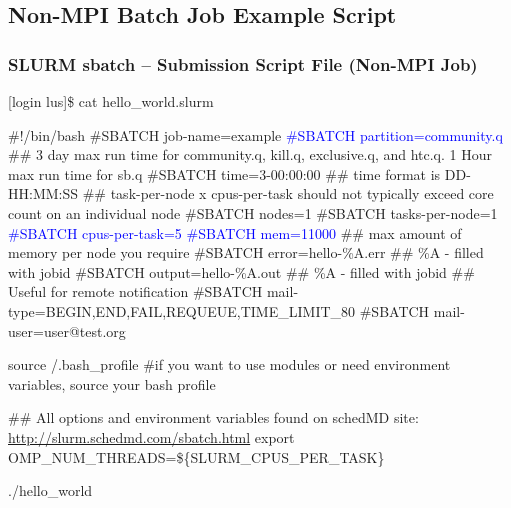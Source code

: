 \subsection{Non-MPI Batch Job Example Script}
\begin{frame}[fragile]
\frametitle{SLURM sbatch -- Submission Script File (Non-MPI Job)}
\begin{semiverbatim}\tiny
[login lus]\$ cat hello_world.slurm

\#!/bin/bash
\#SBATCH \ddash{}job-name=example
\textcolor{blue}{\#SBATCH \ddash{}partition=community.q}
\#\# 3 day max run time for community.q, kill.q, exclusive.q, and htc.q.  1 Hour max run time for sb.q
\#SBATCH \ddash{}time=3-00:00:00 ## time format is DD-HH:MM:SS
\#\# task-per-node x cpus-per-task should not typically exceed core count on an individual node 
\#SBATCH \ddash{}nodes=1
\#SBATCH \ddash{}tasks-per-node=1
\textcolor{blue}{\#SBATCH \ddash{}cpus-per-task=5}
\textcolor{blue}{\#SBATCH \ddash{}mem=11000} \#\# max amount of memory per node you require
\#SBATCH \ddash{}error=hello-\%A.err \#\# \%A - filled with jobid
\#SBATCH \ddash{}output=hello-\%A.out \#\# \%A - filled with jobid
\#\# Useful for remote notification
\#SBATCH \ddash{}mail-type=BEGIN,END,FAIL,REQUEUE,TIME\_LIMIT\_80
\#SBATCH \ddash{}mail-user=user@test.org

source \ctilde/.bash_profile \#if you want to use modules or need environment variables, source your bash profile

\#\# All options and environment variables found on schedMD site: \href{http://slurm.schedmd.com/sbatch.html}{http://slurm.schedmd.com/sbatch.html}
export OMP\_NUM\_THREADS=\$\{SLURM\_CPUS\_PER\_TASK\}

./hello\_world
\end{semiverbatim}
\end{frame}


